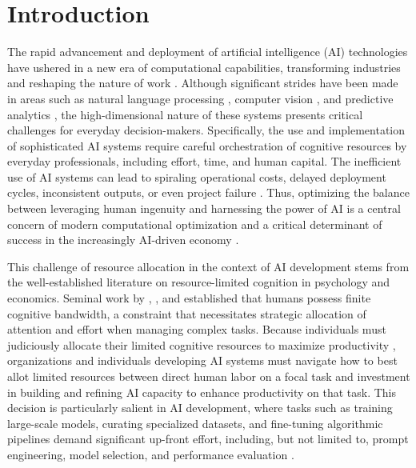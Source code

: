 \documentclass[11pt]{article}
\theoremstyle{definition}
\theoremstyle{remark}
\begin{document}
\section{Introduction}
The rapid advancement and deployment of artificial intelligence (AI) technologies have ushered in a new era of computational capabilities, transforming industries and reshaping the nature of work \citep{hoffmann2024generative}. Although significant strides have been made in areas such as natural language processing \citep{vaswani2017attention}, computer vision \citep{he2016deep}, and predictive analytics \citep{bzdok2018machine}, the high-dimensional nature of these systems presents critical challenges for everyday decision-makers. Specifically, the use and implementation of sophisticated AI systems require careful orchestration of cognitive resources by everyday professionals, including effort, time, and human capital. The inefficient use of AI systems can lead to spiraling operational costs, delayed deployment cycles, inconsistent outputs, or even project failure \citep{heath2019prediction}. Thus, optimizing the balance between leveraging human ingenuity and harnessing the power of AI is a central concern of modern computational optimization and a critical determinant of success in the increasingly AI-driven economy \citep{furman2019ai}.

This challenge of resource allocation in the context of AI development stems from the well-established literature on resource-limited cognition in psychology and economics. Seminal work by \cite{simon1955behavioral}, \cite{kahneman1973attention}, and \cite{baumeister2018ego} established that humans possess finite cognitive bandwidth, a constraint that necessitates strategic allocation of attention and effort when managing complex tasks. Because individuals must judiciously allocate their limited cognitive resources to maximize productivity \citep{norman1975data}, organizations and individuals developing AI systems must navigate how to best allot limited resources between direct human labor on a focal task and investment in building and refining AI capacity to enhance productivity on that task. This decision is particularly salient in AI development, where tasks such as training large-scale models, curating specialized datasets, and fine-tuning algorithmic pipelines demand significant up-front effort, including, but not limited to, prompt engineering, model selection, and performance evaluation \citep{amodei2016concrete,mallen2024balancing}.
\end{document}
